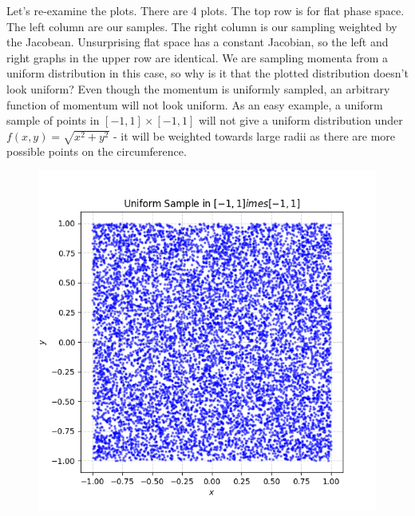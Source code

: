 Let's re-examine the plots. There are 4 plots. The top row is for flat phase space. The left column are our samples. The right column is our sampling weighted by the Jacobean. Unsurprising flat space has a constant Jacobian, so the left and right graphs in the upper row are identical. We are sampling momenta from a uniform distribution in this case, so why is it that the plotted distribution doesn't look uniform? Even though the momentum is uniformly sampled, an arbitrary function of momentum will not look uniform. As an easy example, a uniform sample of points in $[-1,1]\times [-1,1]$ will not give a uniform distribution under $f(x,y)=\sqrt{x^2+y^2}$ - it will be weighted towards large radii as there are more possible points on the circumference. 
 \begin{figure}[H]
                 \centering
                 \begin{minipage}{.4\textwidth}
    \centering
    \includegraphics[width=\textwidth]{tex/ims/unixy.png}
    \end{minipage}
    \begin{minipage}{.4\textwidth}
    \centering

\end{minipage}
\end{figure}
